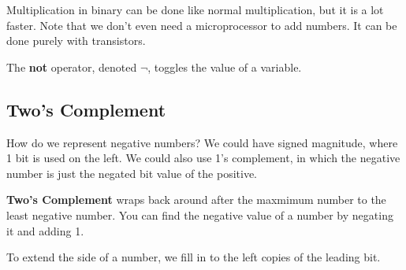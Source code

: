 
Multiplication in binary can be done like normal multiplication, but it is a lot faster. Note that we don't even need a microprocessor to add numbers. It can be done purely with transistors.

\begin{definition}
	The \textbf{not} operator, denoted \( \neg \), toggles the value of a variable.
\end{definition}

\subsection{Two's Complement}

How do we represent negative numbers? We could have signed magnitude, where 1 bit is used on the left. We could also use 1's complement, in which the negative number is just the negated bit value of the positive.

\begin{definition}
	\textbf{Two's Complement} wraps back around after the maxmimum number to the least negative number. You can find the negative value of a number by negating it and adding 1.
\end{definition}

To extend the side of a number, we fill in to the left copies of the leading bit.
